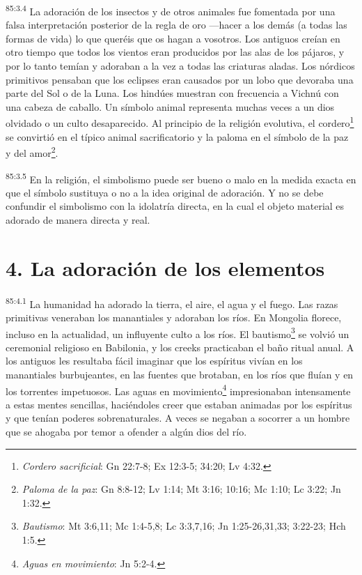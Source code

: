 \documentclass[twoside, 11pt]{book}
\begin{document}
\par
\textsuperscript{85:3.4} La adoración de los insectos y de otros animales fue fomentada por una falsa interpretación posterior de la regla de oro ---hacer a los demás (a todas las formas de vida) lo que queréis que os hagan a vosotros. Los antiguos creían en otro tiempo que todos los vientos eran producidos por las alas de los pájaros, y por lo tanto temían y adoraban a la vez a todas las criaturas aladas. Los nórdicos primitivos pensaban que los eclipses eran causados por un lobo que devoraba una parte del Sol o de la Luna. Los hindúes muestran con frecuencia a Vichnú con una cabeza de caballo. Un símbolo animal representa muchas veces a un dios olvidado o un culto desaparecido. Al principio de la religión evolutiva, el cordero\footnote{\textit{Cordero sacrificial}: Gn 22:7-8; Ex 12:3-5; 34:20; Lv 4:32.} se convirtió en el típico animal sacrificatorio y la paloma en el símbolo de la paz y del amor\footnote{\textit{Paloma de la paz}: Gn 8:8-12; Lv 1:14; Mt 3:16; 10:16; Mc 1:10; Lc 3:22; Jn 1:32.}.

\par
\textsuperscript{85:3.5} En la religión, el simbolismo puede ser bueno o malo en la medida exacta en que el símbolo sustituya o no a la idea original de adoración. Y no se debe confundir el simbolismo con la idolatría directa, en la cual el objeto material es adorado de manera directa y real.

\section*{4. La adoración de los elementos}
\par
\textsuperscript{85:4.1} La humanidad ha adorado la tierra, el aire, el agua y el fuego. Las razas primitivas veneraban los manantiales y adoraban los ríos. En Mongolia florece, incluso en la actualidad, un influyente culto a los ríos. El bautismo\footnote{\textit{Bautismo}: Mt 3:6,11; Mc 1:4-5,8; Lc 3:3,7,16; Jn 1:25-26,31,33; 3:22-23; Hch 1:5.} se volvió un ceremonial religioso en Babilonia, y los creeks practicaban el baño ritual anual. A los antiguos les resultaba fácil imaginar que los espíritus vivían en los manantiales burbujeantes, en las fuentes que brotaban, en los ríos que fluían y en los torrentes impetuosos. Las aguas en movimiento\footnote{\textit{Aguas en movimiento}: Jn 5:2-4.} impresionaban intensamente a estas mentes sencillas, haciéndoles creer que estaban animadas por los espíritus y que tenían poderes sobrenaturales. A veces se negaban a socorrer a un hombre que se ahogaba por temor a ofender a algún dios del río.
\end{document}
